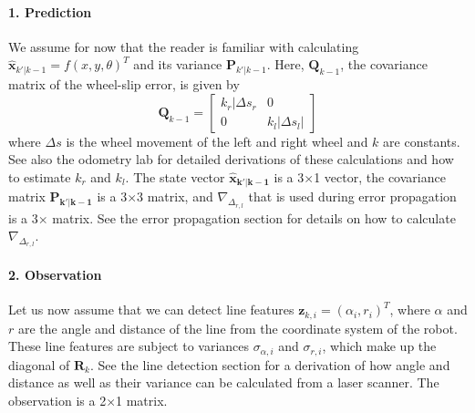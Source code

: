\paragraph{1. Prediction}
We assume for now that the reader is familiar with calculating $ \hat{\boldsymbol{x}}_{k'|k-1}=f(x,y,\theta)^T$ and its variance $ \boldsymbol{P}_{k'|k-1}$. Here, $ \boldsymbol{Q}_{k-1}$, the covariance matrix of the wheel-slip error,  is given by
\begin{equation}
\boldsymbol{Q}_{k-1}=\left[\begin{array}{cc}k_r|\Delta s_r & 0\\0 & k_l|\Delta s_l|\end{array}\right]
\end{equation}
where $ \Delta s$ is the wheel movement of the left and right wheel and $ k$ are constants. See also the odometry lab for detailed derivations of these calculations and how to estimate $ k_r$ and $ k_l$.  The state vector $ \boldsymbol{\hat{x}_{k'|k-1}}$ is a 3$\times$1 vector, the covariance matrix $ \boldsymbol{P_{k'|k-1}}$ is a 3$\times$3 matrix, and $ \nabla_{\Delta_{r,l}}$ that is used during error propagation is a 3$\times$ matrix. See the error propagation section for details on how to calculate $ \nabla_{\Delta_{r,l}}$.


\paragraph{2. Observation}
Let us now assume that we can detect line features $ \boldsymbol{z}_{k,i}=(\alpha_i,r_i)^T$, where $ \alpha$ and $ r$ are the angle and distance of the line from the coordinate system of the robot. These line features are subject to variances $ \sigma_{\alpha,i}$ and $ \sigma_{r,i}$, which make up the diagonal of $ \boldsymbol{R}_{k}$. See the line detection section for a derivation of how angle and distance as well as their variance can be calculated from a laser scanner. The observation is a 2$\times$1 matrix.

